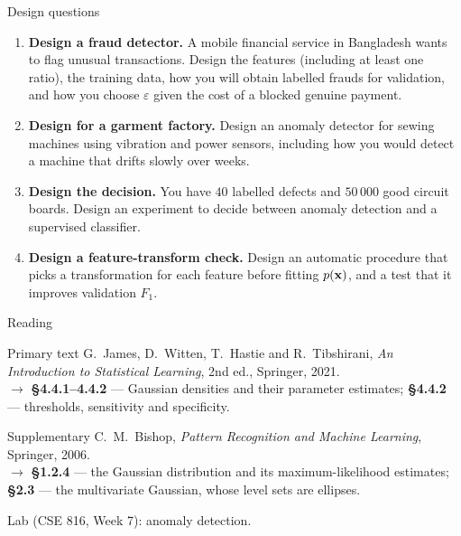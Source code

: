 \documentclass[aspectratio=169,10pt]{beamer}
\begin{document}
\begin{frame}{Design questions}
  \footnotesize
  \begin{enumerate}
    \item \textbf{Design a fraud detector.} A mobile financial service in Bangladesh wants
          to flag unusual transactions. Design the features (including at least one ratio),
          the training data, how you will obtain labelled frauds for validation, and how
          you choose $\varepsilon$ given the cost of a blocked genuine payment.
          \hfill{}
    \item \textbf{Design for a garment factory.} Design an anomaly detector for sewing
          machines using vibration and power sensors, including how you would detect a
          machine that drifts slowly over weeks. \hfill{}
    \item \textbf{Design the decision.} You have $40$ labelled defects and $50\,000$ good
          circuit boards. Design an experiment to decide between anomaly detection and a
          supervised classifier. \hfill{}
    \item \textbf{Design a feature-transform check.} Design an automatic procedure that
          picks a transformation for each feature before fitting $p(\mathbf{x})$, and a test
          that it improves validation $F_1$. \hfill{}
  \end{enumerate}
\end{frame}

\begin{frame}{Reading}
  \begin{block}{Primary text}
    G.~James, D.~Witten, T.~Hastie and R.~Tibshirani,
    \emph{An Introduction to Statistical Learning}, 2nd ed., Springer, 2021.\\[2pt]
    \hfill{\small$\rightarrow$ \textbf{\S4.4.1--4.4.2} --- Gaussian densities and their
    parameter estimates; \textbf{\S4.4.2} --- thresholds, sensitivity and specificity.}
  \end{block}
  \begin{block}{Supplementary}
    C.~M.~Bishop, \emph{Pattern Recognition and Machine Learning}, Springer, 2006.\\[2pt]
    \hfill{\small$\rightarrow$ \textbf{\S1.2.4} --- the Gaussian distribution and its
    maximum-likelihood estimates; \textbf{\S2.3} --- the multivariate Gaussian, whose
    level sets are ellipses.}
  \end{block}
  \vspace{1mm}
  \begin{center}
    \small\color{cugray}
    Lab (CSE 816, Week 7): anomaly detection.
  \end{center}
\end{frame}
\end{document}
